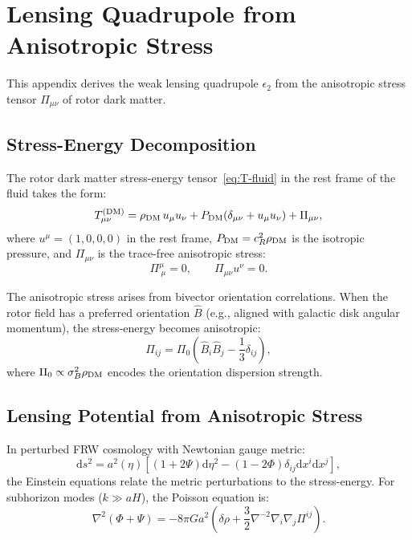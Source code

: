 \documentclass[11pt,a4paper]{article}
\numberwithin{equation}{section}
\theoremstyle{plain}
\theoremstyle{definition}
\theoremstyle{remark}
\newcommand{\dd}{\mathrm{d}}
\begin{document}
\section{Lensing Quadrupole from Anisotropic Stress}\label{app:lensing}

This appendix derives the weak lensing quadrupole $\epsilon_2$ from the anisotropic stress tensor $\Pi_{\mu\nu}$ of rotor dark matter.

\subsection{Stress-Energy Decomposition}

The rotor dark matter stress-energy tensor~\eqref{eq:T-fluid} in the rest frame of the fluid takes the form:
\begin{equation}
T^{(\rm DM)}_{\mu\nu} = \rho_{\rm DM}\,u_\mu u_\nu + P_{\rm DM}(\delta_{\mu\nu} + u_\mu u_\nu) + \Pi_{\mu\nu},
\end{equation}
where $u^\mu = (1,0,0,0)$ in the rest frame, $P_{\rm DM} = c_R^2 \rho_{\rm DM}$ is the isotropic pressure, and $\Pi_{\mu\nu}$ is the trace-free anisotropic stress:
\begin{equation}
\Pi^\mu_{\ \mu} = 0, \qquad \Pi_{\mu\nu}u^\nu = 0.
\end{equation}

The anisotropic stress arises from bivector orientation correlations. When the rotor field has a preferred orientation $\hat B$ (e.g., aligned with galactic disk angular momentum), the stress-energy becomes anisotropic:
\begin{equation}
\Pi_{ij} = \Pi_0\left(\hat B_i \hat B_j - \frac{1}{3}\delta_{ij}\right),
\end{equation}
where $\Pi_0 \propto \sigma_B^2 \rho_{\rm DM}$ encodes the orientation dispersion strength.

\subsection{Lensing Potential from Anisotropic Stress}

In perturbed FRW cosmology with Newtonian gauge metric:
\begin{equation}
\dd s^2 = a^2(\eta)\left[(1+2\Psi)\dd\eta^2 - (1-2\Phi)\delta_{ij}\dd x^i \dd x^j\right],
\end{equation}
the Einstein equations relate the metric perturbations to the stress-energy. For subhorizon modes ($k \gg aH$), the Poisson equation is:
\begin{equation}
\nabla^2(\Phi + \Psi) = -8\pi G a^2 \left(\delta\rho + \frac{3}{2}\nabla^{-2}\nabla_i\nabla_j\Pi^{ij}\right).
\label{eq:poisson-aniso}
\end{equation}
\end{document}
